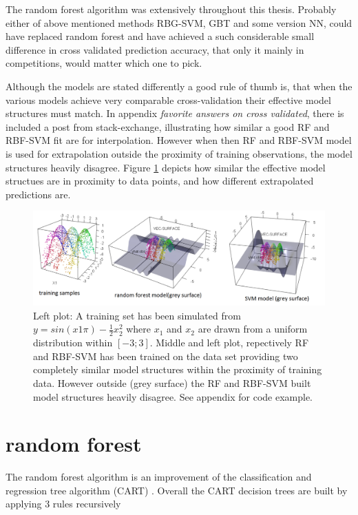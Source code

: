 The random forest algorithm was extensively throughout this thesis. Probably either of above mentioned methods RBG-SVM, GBT and some version NN, could have replaced random forest and have achieved a such considerable small difference in cross validated prediction accuracy, that only it mainly in competitions, would matter which one to pick. 

Although the models are stated differently a good rule of thumb is, that when the various models achieve very comparable cross-validation their effective model structures must match. In appendix \textit{favorite answers on cross validated}, there is included a post from stack-exchange, illustrating how similar a good RF and RBF-SVM fit are for interpolation. However when then RF and RBF-SVM model is used for extrapolation outside the proximity of training observations, the model structures heavily disagree. Figure \ref{svmVSrf} depicts how similar the effective model structues are in proximity to data points, and how different extrapolated predictions are.

\begin{figure}[!htbp]
\includegraphics[width=\textwidth,height=\textheight,keepaspectratio]{graphics/svmVSrf.png}
\caption{Left plot: A training set has been simulated from  $y = sin(x1 \pi) − \frac 1 2 x_2^2$ where $x_1$ and $x_2$ are drawn from a uniform distribution within $[-3;3]$. Middle and left plot, repectively RF and RBF-SVM has been trained on the data set providing two completely similar model structures within the proximity of training data. However outside (grey surface) the RF and RBF-SVM built model structures heavily disagree. See appendix for code example.}
\label{svmVSrf}
\end{figure}


\section{random forest}
The random forest algorithm is an improvement of the classification and regression tree algorithm (CART) \cite{breiman1984classification,breiman2001random}. Overall the CART decision trees are built by applying 3 rules recursively

